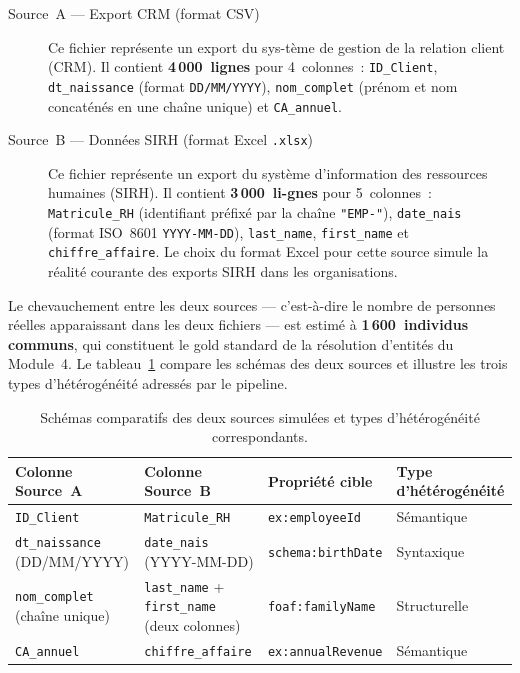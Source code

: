 \begin{description}
  \item[Source~A --- Export CRM (format CSV)] Ce fichier représente
    un export du sys-tème de gestion de la relation client (CRM). Il
    contient \textbf{4\,000~lignes} pour 4~colonnes~:
    \texttt{ID\_Client}, \texttt{dt\_naissance} (format
    \texttt{DD/MM/YYYY}), \texttt{nom\_complet} (prénom et nom
    concaténés en une chaîne unique) et \texttt{CA\_annuel}.

  \item[Source~B --- Données SIRH (format Excel \texttt{.xlsx})] Ce
    fichier représente un export du système d'information des
    ressources humaines (SIRH). Il contient \textbf{3\,000~li-gnes}
    pour 5~colonnes~: \texttt{Matricule\_RH} (identifiant préfixé
    par la chaîne \texttt{"EMP-"}), \texttt{date\_nais} (format
    ISO~8601 \texttt{YYYY-MM-DD}), \texttt{last\_name},
    \texttt{first\_name} et \\ \texttt{chiffre\_affaire}. Le choix du
    format Excel pour cette source simule la réalité courante des
    exports SIRH dans les organisations.
\end{description}

\noindent Le chevauchement entre les deux sources --- c'est-à-dire
le nombre de personnes réelles apparaissant dans les deux fichiers
--- est estimé à \textbf{1\,600~individus communs}, qui constituent
le gold standard de la résolution d'entités du Module~4. Le
tableau~\ref{tab:schema_sources} compare les schémas des deux
sources et illustre les trois types d'hétérogénéité adressés par
le pipeline.

\begin{table}[h]
\centering
\caption{Schémas comparatifs des deux sources simulées et types
         d'hétérogénéité correspondants.}
\label{tab:schema_sources}
\begin{tabular}{p{3.0cm}p{3.2cm}p{3.2cm}p{2.8cm}}
\hline
\textbf{Colonne Source~A}
  & \textbf{Colonne Source~B}
  & \textbf{Propriété cible}
  & \textbf{Type d'hétéro\-généité} \\
\hline
\texttt{ID\_Client}
  & \texttt{Matricule\_RH}
  & \texttt{ex:employeeId}
  & Sémantique \\
\texttt{dt\_naissance} \newline (DD/MM/YYYY)
  & \texttt{date\_nais} \newline (YYYY-MM-DD)
  & \texttt{schema:birthDate}
  & Syntaxique \\
\texttt{nom\_complet} \newline (chaîne unique)
  & \texttt{last\_name} + \newline \texttt{first\_name} \newline (deux colonnes)
  & \texttt{foaf:familyName}
  & Structurelle \\
\texttt{CA\_annuel}
  & \texttt{chiffre\_affaire}
  & \texttt{ex:annualRevenue}
  & Sémantique \\
\hline
\end{tabular}
\end{table}

